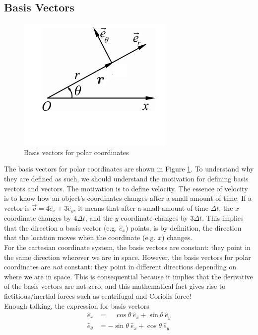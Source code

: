 \documentclass{article}
\begin{document}
\subsection{Basis Vectors}
\label{sec:polarbasis}
\begin{figure}
\includegraphics[width=0.9\linewidth]{images/polarbasis.png}
\caption{Basis vectors for polar coordinates}
\label{fig:polarbasis}
\end{figure}
The basis vectors for polar coordinates are shown in Figure \ref{fig:polarbasis}. To understand why they are defined as such, we should understand the motivation for defining basis vectors and vectors. The motivation is to define velocity. The essence of velocity is to know how an object's coordinates changes after a small amount of time. If a vector is $\vec{v} = 4\hat{e}_x + 3 \hat{e}_y$, it means that after a small amount of time $\Delta t$, the $x$ coordinate changes by $4 \Delta t$, and the $y$ coordinate changes by $3 \Delta t$. This implies that the direction a basis vector (e.g. $\hat{e}_x$) points, is by definition, the direction that the location moves when the coordinate (e.g. $x$) changes.\\[10pt]
For the cartesian coordinate system, the basis vectors are constant: they point in the same direction wherever we are in space. However, the basis vectors for polar coordinates are \textit{not} constant: they point in different directions depending on where we are in space. This is consequential because it implies that the derivative of the basis vectors are not zero, and this mathematical fact gives rise to fictitious/inertial forces such as centrifugal and Coriolis force!\\[10pt]
Enough talking, the expression for basis vectors 
\begin{align}
    \hat{e}_r &=\quad \cos\theta\ \hat{e}_x + \sin\theta\ \hat{e}_y \\
    \hat{e}_\theta &= -\sin\theta\ \hat{e}_x + \cos\theta\ \hat{e}_y
\end{align}
\end{document}
